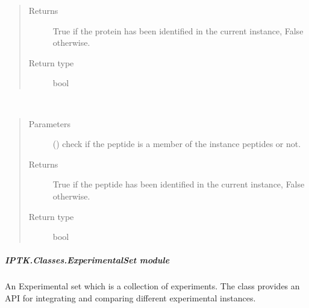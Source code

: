 \documentclass[letterpaper,10pt,english]{sphinxmanual}
\begin{document}
\begin{fulllineitems}
\begin{fulllineitems}
\begin{quote}
\begin{description}
\item[{Returns}] \leavevmode
True if the protein has been identified in the current instance, False otherwise.

\item[{Return type}] \leavevmode
bool

\end{description}\end{quote}

\end{fulllineitems}


\begin{fulllineitems}
\label{\detokenize{IPTK.Classes:IPTK.Classes.Experiment.Experiment.is_member}}~\begin{quote}\begin{description}
\item[{Parameters}] \leavevmode
{} () \textendash{} check if the peptide is a member of the instance peptides or not.

\item[{Returns}] \leavevmode
True if the peptide has been identified in the current instance, False otherwise.

\item[{Return type}] \leavevmode
bool

\end{description}\end{quote}

\end{fulllineitems}


\end{fulllineitems}



\subparagraph{IPTK.Classes.ExperimentalSet module}
\label{\detokenize{IPTK.Classes:module-IPTK.Classes.ExperimentalSet}}\label{\detokenize{IPTK.Classes:iptk-classes-experimentalset-module}}
An Experimental set which is a collection of experiments.
The class provides an API for integrating and comparing different experimental instances.
\end{document}
